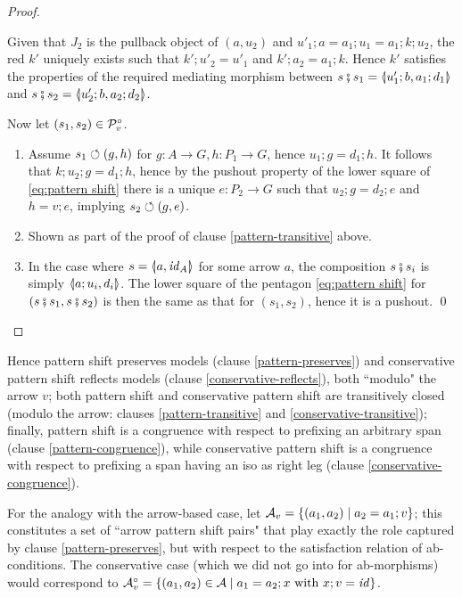 \begin{proof}
\begin{enumerate}[topsep=\smallskipamount]
\begin{center}
\end{center}
%
Given that $J_2$ is the pullback object of $(a,u_2)$ and $u'_1;a=a_1;u_1=a_1;k;u_2$, the red $k'$ uniquely exists such that $k';u'_2=u'_1$ and $k';a_2=a_1;k$. Hence $k'$ satisfies the properties of the required mediating morphism between $s\spcomp s_1=\spanof{u'_1;b}{a_1;d_1}$ and $s\spcomp s_2=\spanof{u'_2;b}{a_2;d_2}$.
\end{enumerate}
%
Now let $(s_1,s_2)\in \mathcal{P}^\circ_v$.
%
\begin{enumerate}[resume,topsep=\smallskipamount]
\item Assume $s_1\circlearrowleft (g,h)$ for $g:A\to G,h:P_1\to G$, hence $u_1;g=d_1;h$. It follows that $k;u_2;g=d_1;h$, hence by the pushout property of the lower square of \eqref{eq:pattern shift} there is a unique $e:P_2\to G$ such that $u_2;g=d_2;e$ and $h=v;e$, implying $s_2\circlearrowleft (g,e)$.

\item Shown as part of the proof of clause \ref{pattern-transitive} above.

\item In the case where $s=\spanof{a}{\id_A}$ for some arrow $a$, the composition $s \fatsemi s_i$ is simply $\spanof{a;u_i}{d_i}$. The lower square of the pentagon \eqref{eq:pattern shift} for $(s\fatsemi s_1,s\fatsemi s_2)$ is then the same as that for $(s_1,s_2)$, hence it is a pushout.
\qed
\end{enumerate}
\end{proof}
%
Hence pattern shift preserves models (clause \ref{pattern-preserves}) and conservative pattern shift reflects models (clause \ref{conservative-reflects}), both ``modulo" the arrow $v$; both pattern shift and conservative pattern shift are transitively closed (modulo the arrow: clauses \ref{pattern-transitive} and \ref{conservative-transitive}); finally, pattern shift is a congruence with respect to prefixing an arbitrary span (clause \ref{pattern-congruence}), while conservative pattern shift is a congruence with respect to prefixing a span having an iso as right leg  (clause \ref{conservative-congruence}).

For the analogy with the arrow-based case, let $\mathcal{A}_v=\{{(a_1,a_2)\mid a_2=a_1;v}\}$; this constitutes a set of ``arrow pattern shift pairs" that play exactly the role captured by clause \ref{pattern-preserves}, but with respect to the satisfaction relation of ab-conditions. The conservative case (which we did not go into for ab-morphisms) would correspond to $\mathcal{A}^\circ_v=\{{(a_1,a_2)\in \mathcal{A}\mid a_1=a_2;x \text{ with } x;v=\mathit{id}}\}$.

